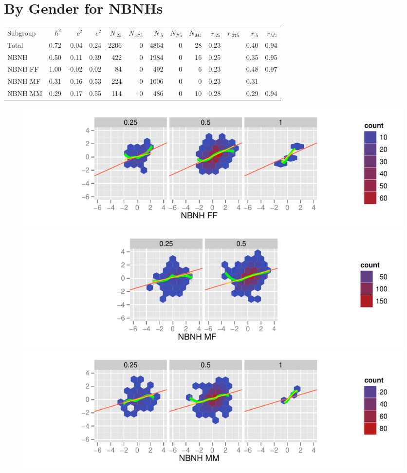 \documentclass[a4paper]{article}
\begin{document}
\newpage
\section{By Gender for NBNHs}
\begin{table}[ht]
\begin{center}
\begin{tabular}{l|rrr|rrrrr|rrrr}
 Subgroup & $h^2$ & $c^2$ & $e^2$ & $N_{.25}$ & $N_{.375}$ & $N_{.5}$ & $N_{.75}$ & $N_{Mz}$ & $r_{.25}$ & $r_{.375}$ & $r_{.5}$ & $r_{Mz}$ \\ 
 Total & 0.72 & 0.04 & 0.24 & 2206 &   0 & 4864 &   0 &  28 & 0.23 &  & 0.40 & 0.94 \\ 
   \hline
NBNH & 0.50 & 0.11 & 0.39 & 422 &   0 & 1984 &   0 &  16 & 0.25 &  & 0.35 & 0.95 \\ 
  NBNH FF & 1.00 & -0.02 & 0.02 &  84 &   0 & 492 &   0 &   6 & 0.23 &  & 0.48 & 0.97 \\ 
  NBNH MF & 0.31 & 0.16 & 0.53 & 224 &   0 & 1006 &   0 &   0 & 0.23 &  & 0.31 &  \\ 
  NBNH MM & 0.29 & 0.17 & 0.55 & 114 &   0 & 486 &   0 &  10 & 0.28 &  & 0.29 & 0.94 \\ 
  \end{tabular}
\end{center}
\end{table}\begin{figure}[htbp]
\includegraphics{Height-022}
\includegraphics{Height-023}
\includegraphics{Height-024}
\end{figure}
\end{document}
